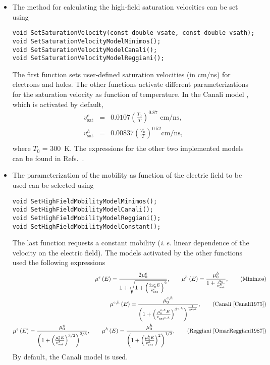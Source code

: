 \begin{itemize}
  \item
  The method for calculating the high-field saturation velocities 
  can be set using
  \begin{lstlisting}
void SetSaturationVelocity(const double vsate, const double vsath);
void SetSaturationVelocityModelMinimos();
void SetSaturationVelocityModelCanali();
void SetSaturationVelocityModelReggiani();
  \end{lstlisting}
  The first function sets user-defined saturation velocities (in cm/ns) for 
  electrons and holes. The other functions activate different parameterizations 
  for the saturation velocity as function of temperature. In the Canali model 
  \cite{Canali1975}, which is activated by default,
  \begin{eqnarray*}
    v_{\text{sat}}^{e} & = & 0.0107 \left(\frac{T_{0}}{T}\right)^{0.87} \text{ cm/ns}, \\ 
    v_{\text{sat}}^{h}  & = & 0.00837 \left(\frac{T_{0}}{T}\right)^{0.52} \text{cm/ns}, \\
  \end{eqnarray*}
  where \(T_{0}\) = 300~K. The expressions for the other two implemented 
  models can be found in Refs.~\cite{OmarReggiani1987,Quay2000}. 
  \item
  The parameterization of the mobility as function of the electric field 
  to be used can be selected using
  \begin{lstlisting}
void SetHighFieldMobilityModelMinimos();
void SetHighFieldMobilityModelCanali();
void SetHighFieldMobilityModelReggiani();
void SetHighFieldMobilityModelConstant();
  \end{lstlisting}
  The last function requests a constant mobility (\textit{i.\,e.} linear dependence of the 
  velocity on the electric field). 
  The models activated by the other functions used the following expressions
  \begin{eqnarray*}
    \mu^{e}\left(E\right) = \frac{2\mu_{0}^{e}}
                             {1 + \sqrt{1 + \left(\frac{2\mu_{0}^{e}E}{v_{\text{sat}}^{e}}\right)^{2}}}, \qquad 
    \mu^{h}\left(E\right) = \frac{\mu_{0}^{h}}{1 + \frac{\mu_{0}}{v_{\text{sat}}^{h}}}, \qquad
    \text{(Minimos)} \\
    \mu^{e,h}\left(E\right) = \frac{\mu_{0}^{e,h}}
                             {\left(1 + \left(\frac{\mu_{0}^{e,h}E}{v_{\text{sat}^{e,h}}}\right)^{\beta^{e,h}}\right)^{\frac{1}{\beta^{e,h}}}}, \qquad 
    \text{(Canali \cite{Canali1975})} \\ 
    \mu^{e}\left(E\right) = \frac{\mu_{0}^{e}}
                             {\left(1 + \left(\frac{\mu_{0}^{e}E}{v_{\text{sat}}^{e}}\right)^{3/2}\right)^{2/3}}, \qquad
    \mu^{h}\left(E\right) = \frac{\mu_{0}^{h}}
                             {\left(1 + \left(\frac{\mu_{0}^{h}E}{v_{\text{sat}}^{h}}\right)^{2}\right)^{1/2}}, \qquad
    \text{(Reggiani \cite{OmarReggiani1987})}
  \end{eqnarray*}
  By default, the Canali model is used.
\end{itemize}

